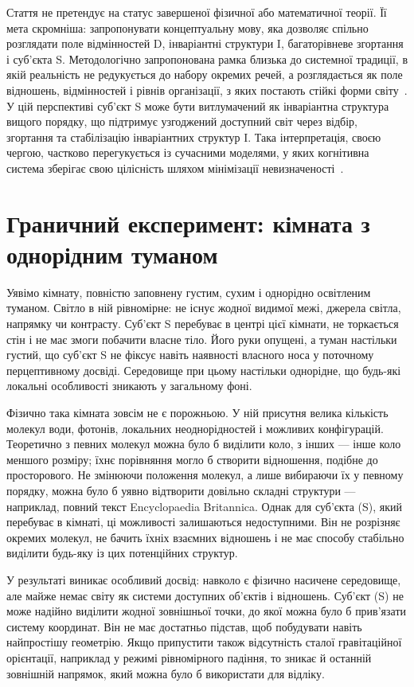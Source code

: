 \documentclass[aps,prd,onecolumn,nofootinbib,superscriptaddress]{revtex4-2}
\begin{document}
Стаття не претендує на статус завершеної фізичної або математичної теорії. Її мета скромніша: запропонувати концептуальну мову, яка дозволяє спільно розглядати поле відмінностей D, інваріантні структури I, багаторівневе згортання і суб’єкта S. Методологічно запропонована рамка близька до системної традиції, в якій реальність не редукується до набору окремих речей, а розглядається як поле відношень, відмінностей і рівнів організації, з яких постають стійкі форми світу~\cite{Bateson1972}. У цій перспективі суб’єкт S може бути витлумачений як інваріантна структура вищого порядку, що підтримує узгоджений доступний світ через відбір, згортання та стабілізацію інваріантних структур I. Така інтерпретація, своєю чергою, частково перегукується із сучасними моделями, у яких когнітивна система зберігає свою цілісність шляхом мінімізації невизначеності~\cite{Friston2010}.
\section{Граничний експеримент: кімната з однорідним туманом}
Уявімо кімнату, повністю заповнену густим, сухим і однорідно освітленим туманом. Світло в ній рівномірне: не існує жодної видимої межі, джерела світла, напрямку чи контрасту. Суб’єкт S перебуває в центрі цієї кімнати, не торкається стін і не має змоги побачити власне тіло. Його руки опущені, а туман настільки густий, що суб’єкт S не фіксує навіть наявності власного носа у поточному перцептивному досвіді. Середовище при цьому настільки однорідне, що будь-які локальні особливості зникають у загальному фоні.

Фізично така кімната зовсім не є порожньою. У ній присутня велика кількість молекул води, фотонів, локальних неоднорідностей і можливих конфігурацій. Теоретично з певних молекул можна було б виділити коло, з інших — інше коло меншого розміру; їхнє порівняння могло б створити відношення, подібне до просторового. Не змінюючи положення молекул, а лише вибираючи їх у певному порядку, можна було б уявно відтворити довільно складні структури — наприклад, повний текст Encyclopaedia Britannica. Однак для суб’єкта (S), який перебуває в кімнаті, ці можливості залишаються недоступними. Він не розрізняє окремих молекул, не бачить їхніх взаємних відношень і не має способу стабільно виділити будь-яку із цих потенційних структур.

У результаті виникає особливий досвід: навколо є фізично насичене середовище, але майже немає світу як системи доступних об’єктів і відношень. Суб’єкт (S) не може надійно виділити жодної зовнішньої точки, до якої можна було б прив’язати систему координат. Він не має достатньо підстав, щоб побудувати навіть найпростішу геометрію. Якщо припустити також відсутність сталої гравітаційної орієнтації, наприклад у режимі рівномірного падіння, то зникає й останній зовнішній напрямок, який можна було б використати для відліку.
\end{document}
